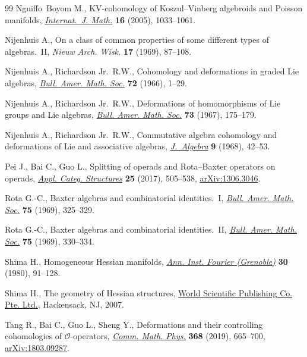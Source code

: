 \documentclass[pdftex]{sigma}%
\numberwithin{equation}{section}
\begin{document}
\begin{thebibliography}{99}
Nguiffo~Boyom M., K{V}-cohomology of {K}oszul--{V}inberg algebroids and
 {P}oisson manifolds, \href{https://doi.org/10.1142/S0129167X0500320X}{\textit{Internat.~J. Math.}} \textbf{16} (2005),
 1033--1061.

Nijenhuis A., On a class of common properties of some different types of
 algebras.~{II}, \textit{Nieuw Arch. Wisk.} \textbf{17} (1969), 87--108.

Nijenhuis A., Richardson Jr.~R.W., Cohomology and deformations in graded {L}ie
 algebras, \href{https://doi.org/10.1090/S0002-9904-1966-11401-5}{\textit{Bull. Amer. Math. Soc.}} \textbf{72} (1966), 1--29.

Nijenhuis A., Richardson Jr.~R.W., Deformations of homomorphisms of {L}ie
 groups and {L}ie algebras, \href{https://doi.org/10.1090/S0002-9904-1967-11703-8}{\textit{Bull. Amer. Math. Soc.}} \textbf{73}
 (1967), 175--179.

Nijenhuis A., Richardson Jr.~R.W., Commutative algebra cohomology and
 deformations of {L}ie and associative algebras, \href{https://doi.org/10.1016/0021-8693(68)90004-5}{\textit{J.~Algebra}}
 \textbf{9} (1968), 42--53.

Pei J., Bai C., Guo L., Splitting of operads and {R}ota--{B}axter operators on
 operads, \href{https://doi.org/10.1007/s10485-016-9431-5}{\textit{Appl. Categ. Structures}} \textbf{25} (2017), 505--538,
 \href{https://arxiv.org/abs/1306.3046}{arXiv:1306.3046}.

Rota G.-C., Baxter algebras and combinatorial identities.~{I}, \href{https://doi.org/10.1090/S0002-9904-1969-12156-7}{\textit{Bull.
 Amer. Math. Soc.}} \textbf{75} (1969), 325--329.

Rota G.-C., Baxter algebras and combinatorial identities.~{II}, \href{https://doi.org/10.1090/S0002-9904-1969-12158-0}{\textit{Bull.
 Amer. Math. Soc.}} \textbf{75} (1969), 330--334.

Shima H., Homogeneous {H}essian manifolds, \href{https://doi.org/10.5802/aif.794}{\textit{Ann. Inst. Fourier
 (Grenoble)}} \textbf{30} (1980), 91--128.

Shima H., The geometry of {H}essian structures, \href{https://doi.org/10.1142/9789812707536}{World Scientific Publishing Co.
 Pte. Ltd.}, Hackensack, NJ, 2007.

Tang R., Bai C., Guo L., Sheng Y., Deformations and their controlling
 cohomologies of {$\mathcal{O}$}-operators, \href{https://doi.org/10.1007/s00220-019-03286-x}{\textit{Comm. Math. Phys.}}
 \textbf{368} (2019), 665--700, \href{https://arxiv.org/abs/1803.09287}{arXiv:1803.09287}.


\end{thebibliography}
\end{document}
